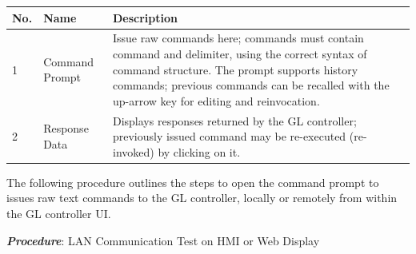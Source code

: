 \begin{longtable}[]{@{}|l|l|l|@{}}
\toprule
\rowcolor{brown}\begin{minipage}[b]{0.04\columnwidth}\raggedright
{\bf{No.}}\strut
\end{minipage} & \begin{minipage}[b]{0.23\columnwidth}\raggedright
{\bf{Name}}\strut
\end{minipage} & \begin{minipage}[b]{0.65\columnwidth}\raggedright
{\bf{Description}}\strut
\end{minipage}\tabularnewline
\midrule
\endhead
\begin{minipage}[t]{0.04\columnwidth}\raggedright
1\strut
\end{minipage} & \begin{minipage}[t]{0.23\columnwidth}\raggedright
Command Prompt\strut
\end{minipage} & \begin{minipage}[t]{0.65\columnwidth}\raggedright
Issue raw commands here; commands must contain command and delimiter,
using the correct syntax of command structure. The prompt supports
history commands; previous commands can be recalled with the up-arrow
key for editing and reinvocation.\strut
\end{minipage}\tabularnewline
\begin{minipage}[t]{0.04\columnwidth}\raggedright
2\strut
\end{minipage} & \begin{minipage}[t]{0.23\columnwidth}\raggedright
Response Data\strut
\end{minipage} & \begin{minipage}[t]{0.65\columnwidth}\raggedright
Displays responses returned by the GL controller; previously issued
command may be re-executed (re-invoked) by clicking on it.\strut
\end{minipage}\tabularnewline
\bottomrule
\end{longtable}

The following procedure outlines the steps to open the command prompt to
issues raw text commands to the GL controller, locally or remotely from
within the GL controller UI.

\textbf{\emph{Procedure}}: LAN Communication Test on HMI or Web Display

